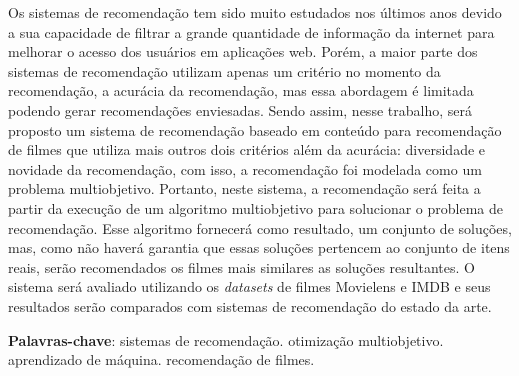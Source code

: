 \setlength{\absparsep}{18pt} %
\begin{resumo}
Os sistemas de recomendação tem sido muito estudados nos últimos anos devido a sua capacidade de filtrar a grande quantidade de informação da internet para melhorar o acesso dos usuários em aplicações web. Porém, a maior parte dos sistemas de recomendação utilizam apenas um critério no momento da recomendação, a acurácia da recomendação, mas essa  abordagem é limitada podendo gerar recomendações enviesadas. Sendo assim, nesse trabalho, será proposto  um sistema de recomendação baseado em conteúdo para recomendação de filmes que utiliza mais outros dois critérios além da acurácia: diversidade e novidade da recomendação, com isso, a recomendação foi modelada como um problema multiobjetivo. Portanto, neste sistema, a recomendação será feita a partir da execução de um algoritmo multiobjetivo para solucionar o problema de recomendação. Esse algoritmo fornecerá como resultado, um conjunto de soluções, mas, como não haverá garantia que essas soluções pertencem ao conjunto de itens reais, serão recomendados os filmes mais similares as soluções resultantes. O sistema será avaliado utilizando os \textit{datasets} de filmes Movielens e IMDB e seus resultados serão comparados com sistemas de recomendação do estado da arte.
 
\textbf{Palavras-chave}: sistemas de recomendação. otimização multiobjetivo. aprendizado de máquina. recomendação de filmes.
\end{resumo}
